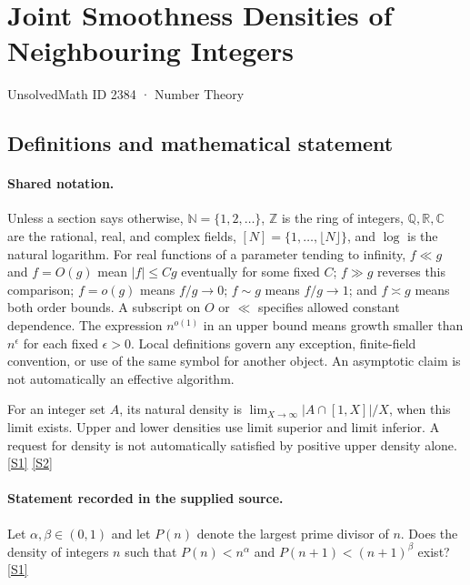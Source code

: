\documentclass[11pt,a4paper]{article}
\newcommand{\N}{\mathbb{N}}
\newcommand{\Z}{\mathbb{Z}}
\newcommand{\Q}{\mathbb{Q}}
\newcommand{\R}{\mathbb{R}}
\newcommand{\C}{\mathbb{C}}
\newcommand{\sref}[2]{\hyperlink{source:#1:#2}{[S#2]}}
\begin{document}

\setcounter{section}{2383}

\section{Joint Smoothness Densities of Neighbouring Integers}\label{2384}

{\small\sffamily UnsolvedMath ID 2384 · Number Theory}

\subsection{Definitions and mathematical statement}

\paragraph{Shared notation.}Unless a section says otherwise, $\N=\{1,2,\ldots\}$,
$\Z$ is the ring of integers, $\Q,\R,\C$ are the rational, real, and complex
fields, $[N]=\{1,\ldots,\lfloor N\rfloor\}$, and $\log$ is the natural
logarithm. For real functions of a parameter tending to infinity,
$f\ll g$ and $f=O(g)$ mean $|f|\leq Cg$ eventually for some fixed $C$;
$f\gg g$ reverses this comparison; $f=o(g)$ means $f/g\to0$;
$f\sim g$ means $f/g\to1$; and $f\asymp g$ means both order bounds.
A subscript on $O$ or $\ll$ specifies allowed constant dependence.
The expression $n^{o(1)}$ in an upper bound means growth smaller than
$n^\epsilon$ for each fixed $\epsilon>0$. Local definitions govern any
exception, finite-field convention, or use of the same symbol for another
object. An asymptotic claim is not automatically an effective algorithm.



For an integer set $A$, its natural density is $\lim_{X\to\infty}|A\cap[1,X]|/X$, when this limit exists. Upper and lower densities use limit superior and limit inferior. A request for density is not automatically satisfied by positive upper density alone. \sref{2384}{1} \sref{2384}{2}

\paragraph{Statement recorded in the supplied source.}
Let $\alpha,\beta\in (0,1)$ and let $P(n)$ denote the largest prime divisor of $n$. Does the density of integers $n$ such that $P(n)<n^{\alpha}$ and $P(n+1)<(n+1)^\beta$ exist? \sref{2384}{1}
\end{document}
